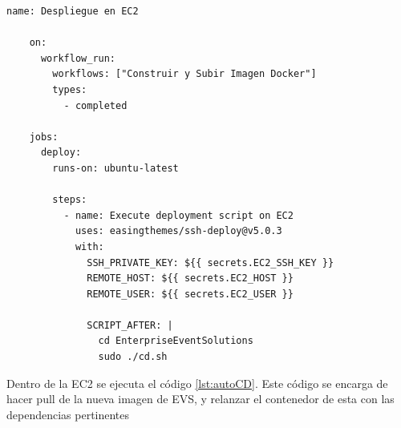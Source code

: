 \begin{lstlisting}[language=HTML, caption=Action de Automatización CD, label=lst:actionEC2]
    name: Despliegue en EC2
    
    on:
      workflow_run:
        workflows: ["Construir y Subir Imagen Docker"]
        types:
          - completed
    
    jobs:
      deploy:
        runs-on: ubuntu-latest
        
        steps:
          - name: Execute deployment script on EC2
            uses: easingthemes/ssh-deploy@v5.0.3
            with:
              SSH_PRIVATE_KEY: ${{ secrets.EC2_SSH_KEY }}
              REMOTE_HOST: ${{ secrets.EC2_HOST }}
              REMOTE_USER: ${{ secrets.EC2_USER }}
              
              SCRIPT_AFTER: |
                cd EnterpriseEventSolutions
                sudo ./cd.sh
    \end{lstlisting}
Dentro de la EC2 se ejecuta el código \ref{lst:autoCD}. Este código se encarga de hacer pull de la nueva imagen de EVS, y relanzar el contenedor de esta con las dependencias pertinentes

